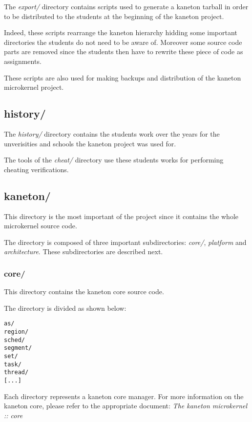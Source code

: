 The \textit{export/} directory contains scripts used to generate a kaneton
tarball in order to be distributed to the students at the beginning of the
kaneton project.

Indeed, these scripts rearrange the kaneton hierarchy hidding some important
directories the students do not need to be aware of. Moreover some source
code parts are removed since the students then have to rewrite these piece
of code as assignments.

These scripts are also used for making backups and distribution of the
kaneton microkernel project.

%
%

\subsection*{history/}

The \textit{history/} directory contains the students work over the years
for the unverisities and schools the kaneton project was used for.

The tools of the \textit{cheat/} directory use these students works for
performing cheating verifications.

%
%

\subsection*{kaneton/}

This directory is the most important of the project since it contains
the whole microkernel source code.

The directory is composed of three important subdirectories: \textit{core/},
\textit{platform} and \textit{architecture}. These subdirectories are described
next.


\subsubsection*{core/}

This directory contains the kaneton core source code.

The directory is divided as shown below:

\begin{verbatim}
as/
region/
sched/
segment/
set/
task/
thread/
[...]
\end{verbatim}

Each directory represents a kaneton core manager. For more information on
the kaneton core, please refer to the appropriate document:
\textit{The kaneton microkernel :: core}

